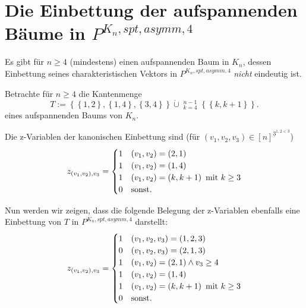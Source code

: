 \documentclass[10p,a4paper,BCOR = 12mm, DIV=15]{scrbook}
\begin{document}
\section{Die Einbettung der aufspannenden Bäume in $P^{K_n, spt, asymm, 4}$}

\begin{Sa}
\label{sa:einb_asymm_4}
Es gibt für $n \geq 4$ (mindestens) einen aufspannenden Baum in $K_n$, dessen Einbettung seines charakteristischen Vektors in $P^{K_n, spt, asymm, 4}$ \emph{nicht} eindeutig ist.
\end{Sa}
\begin{bew}
Betrachte für $n \geq 4$ die Kantenmenge
\begin{displaymath}
T := \left\{
\left\{1, 2\right\}, \left\{1, 4\right\}, \left\{3, 4\right\}
\right\} \mathbin{\dot{\cup}} \mathop{\dot{\bigcup}}_{k=4}^{n-1} \left\{\left\{k, k+1\right\}\right\}.
\end{displaymath}
eines aufspannenden Baums von $K_n$.

Die z-Variablen der kanonischen Einbettung sind (für $\left(v_1, v_2, v_3\right) \in \left[n\right]^{\underline{3}^{1, 2 < 3}}$)
\begin{displaymath}
z_{\left(v_1, v_2\right), v_3} = \begin{cases}
1 & \left(v_1, v_2\right) = \left(2, 1\right) \\
1 & \left(v_1, v_2\right) = \left(1, 4\right) \\
1 & \left(v_1, v_2\right) = \left(k, k+1\right)\textnormal{ mit }k \geq 3 \\
0 & \textnormal{sonst}.
\end{cases}
\end{displaymath}

Nun werden wir zeigen, dass die folgende Belegung der z-Variablen ebenfalls eine Einbettung von $T$ in $P^{K_n, spt, asymm, 4}$ darstellt:
\begin{displaymath}
z_{\left(v_1, v_2\right), v_3} = \begin{cases}
1 & \left(v_1, v_2, v_3\right) = \left(1, 2, 3\right) \\
0 & \left(v_1, v_2, v_3\right) = \left(2, 1, 3\right) \\
1 & \left(v_1, v_2\right) = \left(2, 1\right) \wedge v_3 \geq 4 \\
1 & \left(v_1, v_2\right) = \left(1, 4\right) \\
1 & \left(v_1, v_2\right) = \left(k, k+1\right)\textnormal{ mit }k \geq 3 \\
0 & \textnormal{sonst}.
\end{cases}
\end{displaymath}


\end{bew}
\end{document}
